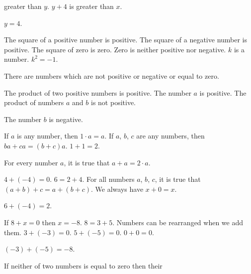 \documentclass[11pt]{book}
\begin{document}
\begin{exercisecols}
\begin{exlist}
\begin{hyp}
      greater than $y$. $y + 4$ is greater than $x$.\end{hyp}
      \begin{thmclaim}$y = 4$.\end{thmclaim}
\item \begin{hyp}The square of a positive number is positive. The square of a
      negative number is positive. The square of zero is zero. Zero is neither
      positive nor negative. $k$ is a number. $k^2 = -1$.\end{hyp}
      \begin{thmclaim}There are numbers which are not positive or negative or
      equal to zero.\end{thmclaim}
\item \begin{hyp}The product of two positive numbers is positive. The number $a$
      is positive. The product of numbers $a$ and $b$ is not positive.\end{hyp}
      \begin{thmclaim}The number $b$ is negative.\end{thmclaim}
\item[\stex 16.] \begin{hyp}If $a$ is any number, then $1 \cdot a = a$. If $a$,
      $b$, $c$ are any numbers, then $ba + ca = (b + c)a$. $1 + 1 = 2$.\end{hyp}
      \begin{thmclaim}For every number $a$, it is true that $a + a = 2 \cdot
      a$.\end{thmclaim}
\item[\stex 17.] \begin{hyp}$4 + (-4) = 0$. $6 = 2 + 4$. For all numbers $a$, $b$,
      $c$, it is true that $(a + b) + c = a + (b + c)$. We always have $x + 0 =
      x$.\end{hyp}
      \begin{thmclaim}$6 + (-4) = 2$.\end{thmclaim}
\item[\stex 18.] \begin{hyp}If $8 + x = 0$ then $x = -8$. $8 = 3 + 5$. Numbers can
      be rearranged when we add them. $3 + (-3) = 0$. $5 + (-5) = 0$. $0 + 0 =
      0$.\end{hyp}
      \begin{thmclaim}$(-3) + (-5) = -8$.\end{thmclaim}
\item[\stex 19.] \begin{hyp}If neither of two numbers is equal to zero then their

\end{hyp}
\end{exlist}
\end{exercisecols}
\end{document}
